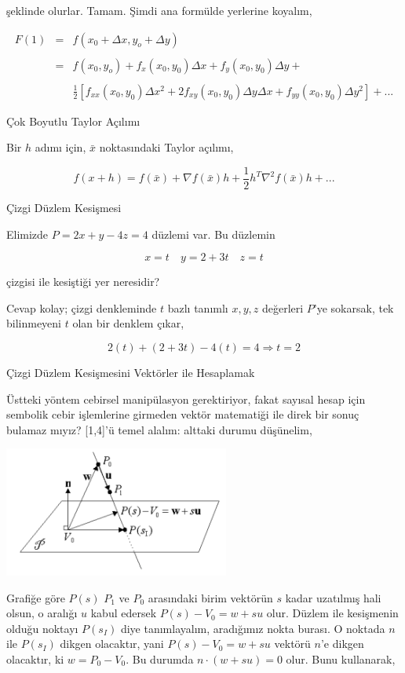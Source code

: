 \documentclass[12pt,fleqn]{article}\usepackage{../../common}
\begin{document}
şeklinde olurlar. Tamam. Şimdi ana formülde yerlerine koyalım,

$$ 
\begin{array}{lll}
F(1) &=&  f(x_0 +\Delta x, y_o + \Delta y)  \\ \\
&=& f(x_0 , y_o) +  f_x(x_0,y_0) \Delta x + f_y(x_0,y_0) \Delta y +   \\ \\
&& \frac{1}{2} 
[ 
f_{xx}(x_0,y_0)\Delta x^2 + 
2f_{xy}(x_0,y_0)\Delta y \Delta x +
f_{yy}(x_0,y_0)\Delta y^2 
] + ... 
\end{array}
 $$

Çok Boyutlu Taylor Açılımı

Bir $h$ adımı için, $\bar{x}$ noktasındaki Taylor açılımı,

$$
f(x + h) = 
f(\bar{x}) + \nabla f(\bar{x}) h + 
\frac{1}{2} h^T \nabla^2f(\bar{x}) h +  ...
$$

Çizgi Düzlem Kesişmesi

Elimizde $P = 2x + y - 4z = 4$ düzlemi var. Bu düzlemin 

$$ x = t \quad y = 2 + 3t \quad z = t$$

çizgisi ile kesiştiği yer neresidir? 

Cevap kolay; çizgi denkleminde $t$ bazlı tanımlı $x,y,z$ değerleri $P$'ye
sokarsak, tek bilinmeyeni $t$ olan bir denklem çıkar, 

$$ 2(t) + (2+3t)-4(t) = 4 \Rightarrow t = 2$$

Çizgi Düzlem Kesişmesini Vektörler ile Hesaplamak

Üstteki yöntem cebirsel manipülasyon gerektiriyor, fakat sayısal hesap için
sembolik cebir işlemlerine girmeden vektör matematiği ile direk bir sonuç
bulamaz mıyız? [1,4]'ü temel alalım: alttaki durumu düşünelim, 

\includegraphics[width=20em]{5_9.png}

Grafiğe göre $P(s)$ $P_1$ ve $P_0$ arasındaki birim vektörün $s$ kadar
uzatılmış hali olsun, o aralığı $u$ kabul edersek $P(s)-V_0 = w + su$
olur. Düzlem ile kesişmenin olduğu noktayı $P(s_I)$ diye tanımlayalım,
aradığımız nokta burası. O noktada $n$ ile $P(s_I)$ dikgen olacaktır, yani
$P(s) - V_0 = w + su$ vektörü $n$'e dikgen olacaktır, ki $w=P_0-V_0$. Bu
durumda $n \cdot (w+su) = 0$ olur. Bunu kullanarak,
\end{document}
